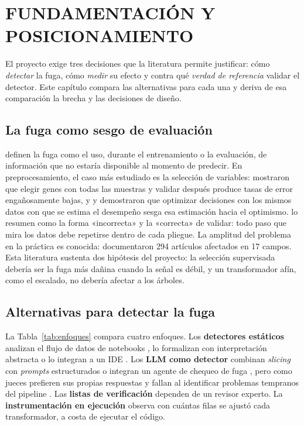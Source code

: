 
\chapter{FUNDAMENTACIÓN Y POSICIONAMIENTO}
\label{ch:fundamentacion}

El proyecto exige tres decisiones que la literatura permite justificar: cómo \emph{detectar} la fuga, cómo \emph{medir} su efecto y contra qué \emph{verdad de referencia} validar el detector. Este capítulo compara las alternativas para cada una y deriva de esa comparación la brecha y las decisiones de diseño.

\section{La fuga como sesgo de evaluación}

\textcite{kaufman2012} definen la fuga como el uso, durante el entrenamiento o la evaluación, de información que no estaría disponible al momento de predecir. En preprocesamiento, el caso más estudiado es la selección de variables: \textcite{ambroise2002} mostraron que elegir genes con todas las muestras y validar después produce tasas de error engañosamente bajas, y \textcite{varma2006} y \textcite{cawley2010} demostraron que optimizar decisiones con los mismos datos con que se estima el desempeño sesga esa estimación hacia el optimismo. \textcite{hastie2009} lo resumen como la forma «incorrecta» y la «correcta» de validar: todo paso que mira los datos debe repetirse dentro de cada pliegue. La amplitud del problema en la práctica es conocida: \textcite{kapoor2023} documentaron 294 artículos afectados en 17 campos. Esta literatura sustenta dos hipótesis del proyecto: la selección supervisada debería ser la fuga más dañina cuando la señal es débil, y un transformador afín, como el escalado, no debería afectar a los árboles.

\section{Alternativas para detectar la fuga}

La Tabla~\ref{tab:enfoques} compara cuatro enfoques. Los \textbf{detectores estáticos} analizan el flujo de datos de notebooks \parencite{yang2022}, lo formalizan con interpretación abstracta \parencite{drobnjakovic2024} o lo integran a un IDE \parencite{alomar2025}. Los \textbf{LLM como detector} combinan \emph{slicing} con \emph{prompts} estructurados \parencite{draoui2026} o integran un agente de chequeo de fuga \parencite{nam2025}, pero como jueces prefieren sus propias respuestas \parencite{zheng2023} y fallan al identificar problemas tempranos del pipeline \parencite{kumar2025}. Las \textbf{listas de verificación} \parencite{lones2024,kapoor2024} dependen de un revisor experto. La \textbf{instrumentación en ejecución} observa con cuántas filas se ajustó cada transformador, a costa de ejecutar el código.

